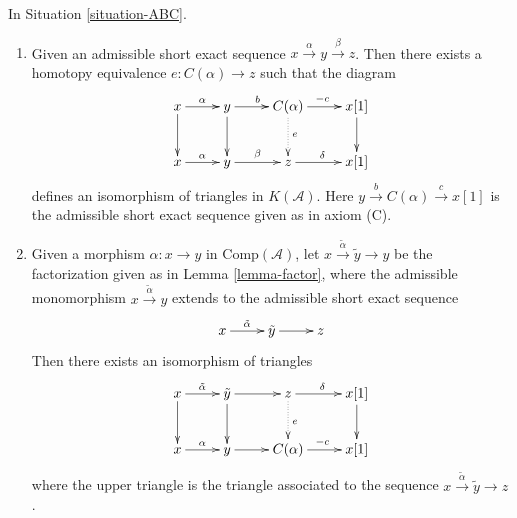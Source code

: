 \begin{lemma}
\label{lemma-cone-homotopy}
In Situation \ref{situation-ABC}.
\begin{enumerate}
\item Given an admissible short exact sequence
$x\xrightarrow{\alpha} y\xrightarrow{\beta} z$.
Then there exists a homotopy equivalence
$e:C(\alpha)\to z$ such that the diagram
\begin{equation}
\label{equation-cone-isom-triangle}
\vcenter{
\xymatrix{
x\ar[r]^{\alpha}\ar[d] &
y\ar[r]^{b}\ar[d] &
C(\alpha)\ar[r]^{-c}\ar@{.>}[d]^{e} &
x[1]\ar[d] \\
x\ar[r]^{\alpha} &
y\ar[r]^{\beta} &
z\ar[r]^{\delta} & x[1]
}
}
\end{equation}
defines an isomorphism of triangles in $K(\mathcal{A})$. Here
$y\xrightarrow{b}C(\alpha)\xrightarrow{c}x[1]$
is the admissible short exact sequence given as in axiom (C).
\item Given a morphism
$\alpha : x \to y$ in $\text{Comp}(\mathcal{A})$, let
$x \xrightarrow{\tilde{\alpha}} \tilde{y} \to y$ be the
factorization given as in Lemma \ref{lemma-factor}, where the admissible
monomorphism $x \xrightarrow{\tilde{\alpha}} y$ extends to the
admissible short exact sequence
$$
\xymatrix{
x \ar[r]^{\tilde{\alpha}} &
\tilde{y} \ar[r] & z
}
$$
Then there exists an isomorphism of triangles
$$
\xymatrix{
x \ar[r]^{\tilde{\alpha}} \ar[d] &
\tilde{y} \ar[r] \ar[d] &
z \ar[r]^{\delta} \ar@{.>}[d]^{e} &
x[1] \ar[d] \\
x \ar[r]^{\alpha} &
y \ar[r] &
C(\alpha) \ar[r]^{-c} &
x[1]
}
$$
where the upper triangle is the triangle
associated to the sequence
$x \xrightarrow{\tilde{\alpha}} \tilde{y} \to z$.
\end{enumerate}
\end{lemma}

